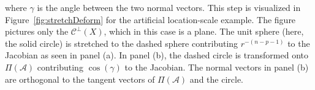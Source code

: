 \documentclass[ba]{imsart}
\newcommand{\bz}{\mbox{\boldmath $z$}}
\newcommand{\mc}{\mathcal}
\begin{document}
where $\gamma$ is the angle between the two normal vectors.
This step is visualized in Figure~\ref{fig:stretchDeform} for the artificial
location-scale example.  The figure pictures only the $\mathcal{C}^{\perp}(X)$,
which in this case is a plane. The unit sphere (here, the
solid circle) is stretched to the dashed sphere contributing
$r^{-(n-p-1)}$ to the Jacobian as seen in panel (a). In panel (b), the
dashed circle is transformed onto $\Pi(\mc A)$ contributing
$\cos(\gamma)$ to the Jacobian. The normal vectors in panel (b) are
orthogonal to the tangent vectors of $\Pi(\mc A)$ and the circle. %

\end{document}
